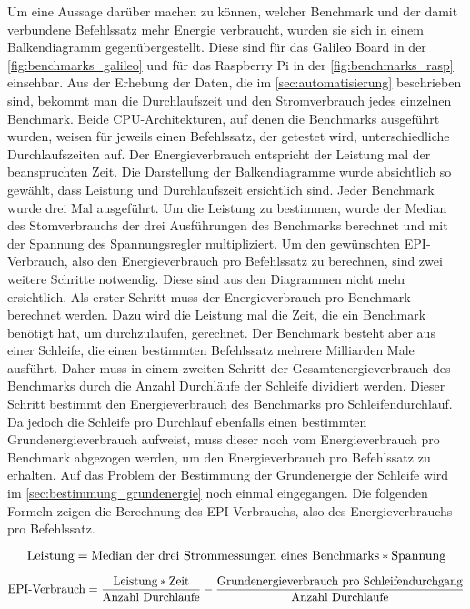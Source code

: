 Um eine Aussage darüber machen zu können, welcher Benchmark und der damit verbundene Befehlssatz mehr Energie verbraucht, wurden sie sich in einem Balkendiagramm gegenübergestellt. Diese sind für das Galileo Board in der \autoref{fig:benchmarks_galileo} und für das Raspberry Pi in der \autoref{fig:benchmarks_rasp} einsehbar. Aus der Erhebung der Daten, die im \autoref{sec:automatisierung} beschrieben sind, bekommt man die Durchlaufszeit und den Stromverbrauch jedes einzelnen Benchmark. Beide CPU-Architekturen, auf denen die Benchmarks ausgeführt wurden, weisen für jeweils einen Befehlssatz, der getestet wird, unterschiedliche Durchlaufszeiten auf. Der Energieverbrauch entspricht der Leistung mal der beanspruchten Zeit. Die Darstellung der Balkendiagramme wurde absichtlich so gewählt, dass Leistung und Durchlaufszeit ersichtlich sind. Jeder Benchmark wurde drei Mal ausgeführt. Um die Leistung zu bestimmen, wurde der Median des Stomverbrauchs der drei Ausführungen des Benchmarks berechnet und mit der Spannung des Spannungsregler multipliziert. Um den gewünschten EPI-Verbrauch, also den Energieverbrauch pro Befehlssatz zu berechnen, sind zwei weitere Schritte notwendig. Diese sind aus den Diagrammen nicht mehr ersichtlich. Als erster Schritt muss der Energieverbrauch pro Benchmark berechnet werden. Dazu wird die Leistung mal die Zeit, die ein Benchmark benötigt hat, um durchzulaufen, gerechnet. Der Benchmark besteht aber aus einer Schleife, die einen bestimmten Befehlssatz mehrere Milliarden Male ausführt. Daher muss in einem zweiten Schritt der Gesamtenergieverbrauch des Benchmarks durch die Anzahl Durchläufe der Schleife dividiert werden. Dieser Schritt bestimmt den Energieverbrauch des Benchmarks pro Schleifendurchlauf. Da jedoch die Schleife pro Durchlauf ebenfalls einen bestimmten Grundenergieverbrauch aufweist, muss dieser noch vom Energieverbrauch pro Benchmark abgezogen werden, um den Energieverbrauch pro Befehlssatz zu erhalten. Auf das Problem der Bestimmung der Grundenergie der Schleife wird im \autoref{sec:bestimmung_grundenergie} noch einmal eingegangen. Die folgenden Formeln zeigen die Berechnung des EPI-Verbrauchs, also des Energieverbrauchs pro Befehlssatz.

\[ \textnormal{Leistung} = \textnormal{Median der drei Strommessungen eines Benchmarks} * \textnormal{Spannung} \]

\[\textnormal{EPI-Verbrauch} = \frac{\textnormal{Leistung} * \textnormal{Zeit}}{\textnormal{Anzahl Durchl{\"a}ufe}} - \frac{\textnormal{Grundenergieverbrauch pro Schleifendurchgang}}{\textnormal{Anzahl Durchl{\"a}ufe}}  \]

